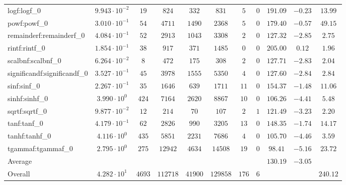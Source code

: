 \begin{tabular}{|l|c|c|c|c|c|c|c|c|c|c|}
logf:logf\_0                 & $ 9.943 \cdot 10^{-2} $ & $ 19     $ & $ 824    $ & $ 332   $ & $ 831    $ & $ 5   $ & $ 0 $ & $ 191.09      $ & $ -0.23   $ & $ 13.99   $ \\
powf:powf\_0                 & $ 3.010 \cdot 10^{-1} $ & $ 54     $ & $ 4711   $ & $ 1490  $ & $ 2368   $ & $ 5   $ & $ 0 $ & $ 179.40      $ & $ -0.57   $ & $ 49.15   $ \\
remainderf:remainderf\_0     & $ 4.084 \cdot 10^{-1} $ & $ 52     $ & $ 2913   $ & $ 1043  $ & $ 3308   $ & $ 2   $ & $ 0 $ & $ 127.32      $ & $ -2.85   $ & $ 2.75    $ \\
rintf:rintf\_0               & $ 1.854 \cdot 10^{-1} $ & $ 38     $ & $ 917    $ & $ 371   $ & $ 1485   $ & $ 0   $ & $ 0 $ & $ 205.00      $ & $ 0.12    $ & $ 1.96    $ \\
scalbnf:scalbnf\_0           & $ 6.264 \cdot 10^{-2} $ & $ 8      $ & $ 472    $ & $ 175   $ & $ 308    $ & $ 2   $ & $ 0 $ & $ 127.71      $ & $ -2.83   $ & $ 2.04    $ \\
significandf:significandf\_0 & $ 3.527 \cdot 10^{-1} $ & $ 45     $ & $ 3978   $ & $ 1555  $ & $ 5350   $ & $ 4   $ & $ 0 $ & $ 127.60      $ & $ -2.84   $ & $ 2.84    $ \\
sinf:sinf\_0                 & $ 2.267 \cdot 10^{-1} $ & $ 35     $ & $ 1646   $ & $ 639   $ & $ 1711   $ & $ 11  $ & $ 0 $ & $ 154.37      $ & $ -1.48   $ & $ 11.06   $ \\
sinhf:sinhf\_0               & $ 3.990 \cdot 10^{0}  $ & $ 424    $ & $ 7164   $ & $ 2620  $ & $ 8867   $ & $ 10  $ & $ 0 $ & $ 106.26      $ & $ -4.41   $ & $ 5.48    $ \\
sqrtf:sqrtf\_0               & $ 9.877 \cdot 10^{-2} $ & $ 12     $ & $ 214    $ & $ 70    $ & $ 107    $ & $ 2   $ & $ 1 $ & $ 121.49      $ & $ -3.23   $ & $ 2.20    $ \\
tanf:tanf\_0                 & $ 4.179 \cdot 10^{-1} $ & $ 62     $ & $ 2826   $ & $ 990   $ & $ 3205   $ & $ 13  $ & $ 0 $ & $ 148.35      $ & $ -1.74   $ & $ 14.17   $ \\
tanhf:tanhf\_0               & $ 4.116 \cdot 10^{0}  $ & $ 435    $ & $ 5851   $ & $ 2231  $ & $ 7686   $ & $ 4   $ & $ 0 $ & $ 105.70      $ & $ -4.46   $ & $ 3.59    $ \\
tgammaf:tgammaf\_0           & $ 2.795 \cdot 10^{0}  $ & $ 275    $ & $ 12942  $ & $ 4634  $ & $ 14508  $ & $ 19  $ & $ 0 $ & $ 98.41       $ & $ -5.16   $ & $ 23.72   $ \\
\hline
Average                      & $                     $ & $        $ & $        $ & $       $ & $        $ & $     $ & $   $ & $ 130.19      $ & $ -3.05   $ & $         $ \\
\hline
Overall                      & $ 4.282 \cdot 10^{1}  $ & $ 4693   $ & $ 112718 $ & $ 41900 $ & $ 129858 $ & $ 176 $ & $ 6 $ & $             $ & $         $ & $ 240.12  $ \\
\hline
\end{tabular}
